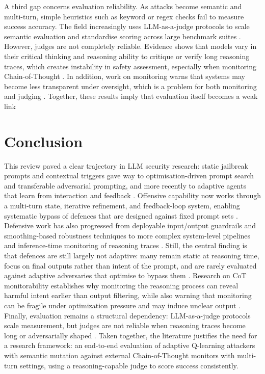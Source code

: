 \documentclass[conference]{IEEEtran}
\begin{document}
A third gap concerns evaluation reliability. As attacks become semantic and multi-turn, simple heuristics such as keyword or regex checks fail to measure success accuracy. The field increasingly uses LLM-as-a-judge protocols to scale semantic evaluation and standardise scoring across large benchmark suites \cite{b9}. However, judges are not completely reliable. Evidence shows that models vary in their critical thinking and reasoning ability to critique or verify long reasoning traces, which creates instability in safety assessment, especially when monitoring Chain-of-Thought \cite{b8}. In addition, work on monitoring warns that systems may become less transparent under oversight, which is a problem for both monitoring and judging \cite{b7}. Together, these results imply that evaluation itself becomes a weak link


\section{Conclusion}

This review paved a clear trajectory in LLM security research: static jailbreak prompts and contextual triggers gave way to optimisation-driven prompt search and transferable adversarial prompting, and more recently to adaptive agents that learn from interaction and feedback \cite{b10,b12,b13,b14,b15,b16}. Offensive capability now works through a multi-turn state, iterative refinement, and feedback-loop system, enabling systematic bypass of defences that are designed against fixed prompt sets \cite{b13,b14,b15,b16}. Defensive work has also progressed from deployable input/output guardrails and smoothing-based robustness techniques to more complex system-level pipelines and inference-time monitoring of reasoning traces \cite{b17,b18,b19,b23}. Still, the central finding is that defences are still largely not adaptive: many remain static at reasoning time, focus on final outputs rather than intent of the prompt, and are rarely  evaluated against adaptive adversaries that optimise to bypass them \cite{b17,b18,b19,b23}. Research on CoT monitorability establishes why monitoring the reasoning process can reveal harmful intent earlier than output filtering, while also warning that monitoring can be fragile under optimization pressure and may induce unclear output \cite{b6,b7}. Finally, evaluation remains a structural dependency: LLM-as-a-judge protocols scale measurement, but judges are not reliable when reasoning traces become long or adversarially shaped \cite{b8,b9}. Taken together, the literature justifies the need for a research framework: an end-to-end evaluation of adaptive Q-learning attackers with semantic mutation against external Chain-of-Thought monitors with multi-turn settings, using a reasoning-capable judge to score success consistently.






\end{document}
